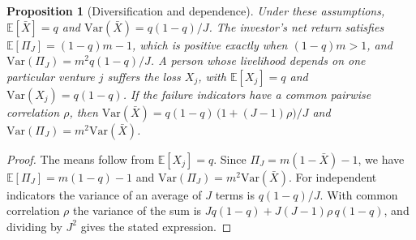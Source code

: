 \documentclass[11pt]{article}
\newtheorem{proposition}{Proposition}
\theoremstyle{remark}
\newcommand{\E}{\mathbb{E}}
\newcommand{\Var}{\mathrm{Var}}
\begin{document}
\begin{proposition}[Diversification and dependence]\label{prop:portfolio}
Under these assumptions, $\E[\bar X]=q$ and $\Var(\bar X)=q(1-q)/J$. The investor's net return satisfies $\E[\Pi_J]=(1-q)m-1$, which is positive exactly when $(1-q)m>1$, and $\Var(\Pi_J)=m^2q(1-q)/J$. A person whose livelihood depends on one particular venture $j$ suffers the loss $X_j$, with $\E[X_j]=q$ and $\Var(X_j)=q(1-q)$. If the failure indicators have a common pairwise correlation $\rho$, then $\Var(\bar X)=q(1-q)\,\bigl(1+(J-1)\rho\bigr)/J$ and $\Var(\Pi_J)=m^2\Var(\bar X)$.
\end{proposition}

\begin{proof}
The means follow from $\E[X_j]=q$. Since $\Pi_J=m(1-\bar X)-1$, we have $\E[\Pi_J]=m(1-q)-1$ and $\Var(\Pi_J)=m^2\Var(\bar X)$. For independent indicators the variance of an average of $J$ terms is $q(1-q)/J$. With common correlation $\rho$ the variance of the sum is $Jq(1-q)+J(J-1)\rho\,q(1-q)$, and dividing by $J^2$ gives the stated expression.
\end{proof}
\end{document}
